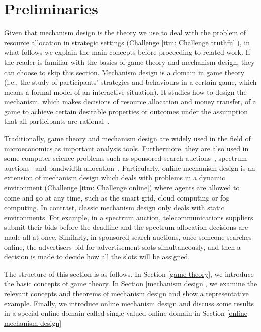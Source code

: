\documentclass[11pt]{phdthesis}
\begin{document}
\section{Preliminaries} \label{preliminaries}
Given that mechanism design is the theory we use to deal with the problem of resource allocation in strategic settings (Challenge \ref{itm: Challenge truthful}), in what follows we explain the main concepts before proceeding to related work. If the reader is familiar with the basics of game theory and mechanism design, they can choose to skip this section. Mechanism design is a domain in game theory (i.e., the study of participants' strategies and behaviours in a certain game, which means a formal model of an interactive situation). It studies how to design the mechanism, which makes decisions of resource allocation and money transfer, of a game to achieve certain desirable properties or outcomes under the assumption that all participants are rational~\citep{hurwicz1973design}. 

Traditionally, game theory and mechanism design are widely used in the field of microeconomics as important analysis tools. Furthermore, they are also used in some computer science problems such as sponsored search auctions~\citep{zhu2012truthful}, spectrum auctions~\citep{qin2015sponsored} and bandwidth allocation~\citep{wu2012auction}. Particularly, online mechanism design is an extension of mechanism design which deals with problems in a dynamic environment (Challenge \ref{itm: Challenge online}) where agents are allowed to come and go at any time, such as the smart grid, cloud computing or fog computing. In contrast, classic mechanism design only deals with static environments. For example, in a spectrum auction, telecommunications suppliers submit their bids before the deadline and the spectrum allocation decisions are made all at once. Similarly, in sponsored search auctions, once someone searches online, the advertisers bid for advertisement slots simultaneously, and then a decision is made to decide how all the slots will be assigned. 

The structure of this section is as follows. 
In Section \ref{game theory}, we introduce the basic concepts of game theory. In Section \ref{mechanism design}, we examine the relevant concepts and theorems of mechanism design and show a representative example. Finally, we introduce online mechanism design and discuss some results in a special online domain called single-valued online domain in Section \ref{online mechanism design}
\end{document}
